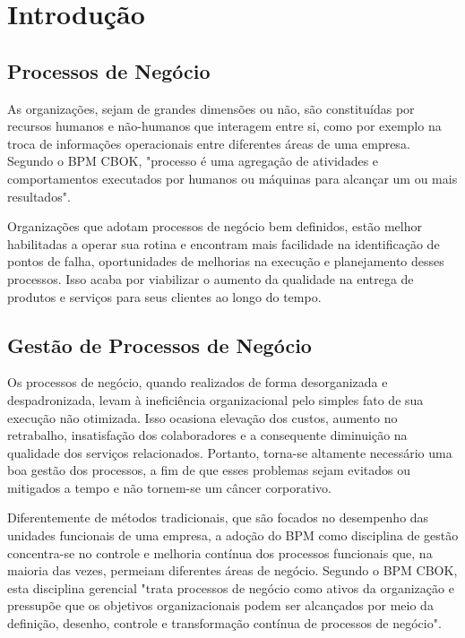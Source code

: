 \chapter{Introdução}\label{chp:introducao}

\section{Processos de Negócio}\label{sec:introducao-processos_negocio}

As organizações, sejam de grandes dimensões ou não, são constituídas por recursos humanos e não-humanos que interagem entre si, como por exemplo na troca de informações operacionais entre diferentes áreas de uma empresa. Segundo o BPM CBOK\cite{bpm_cbok}, "processo é uma agregação de atividades e comportamentos executados por humanos ou máquinas para alcançar um ou mais resultados".

Organizações que adotam processos de negócio bem definidos, estão melhor habilitadas a operar sua rotina e encontram mais facilidade na identificação de pontos de falha, oportunidades de melhorias na execução e planejamento desses processos. Isso acaba por viabilizar o aumento da qualidade na entrega de produtos e serviços para seus clientes ao longo do tempo.

\section{Gestão de Processos de Negócio}\label{sec:introducao-gestaoo}

Os processos de negócio, quando realizados de forma desorganizada e despadronizada, levam à ineficiência organizacional pelo simples fato de sua execução não otimizada. Isso ocasiona elevação dos custos, aumento no retrabalho, insatisfação dos colaboradores e a consequente diminuição na qualidade dos serviços relacionados. Portanto, torna-se altamente necessário uma boa gestão dos processos, a fim de que esses problemas sejam evitados ou mitigados a tempo e não tornem-se um câncer corporativo. 

Diferentemente de métodos tradicionais, que são focados no desempenho das unidades funcionais de uma empresa, a adoção do BPM como disciplina de gestão concentra-se no controle e melhoria contínua dos processos funcionais que, na maioria das vezes, permeiam diferentes áreas de negócio. Segundo o BPM CBOK\cite{bpm_cbok}, esta disciplina gerencial "trata processos de negócio como ativos da organização e pressupõe que os objetivos organizacionais podem ser alcançados por meio da definição, desenho, controle e transformação contínua de processos de negócio".

